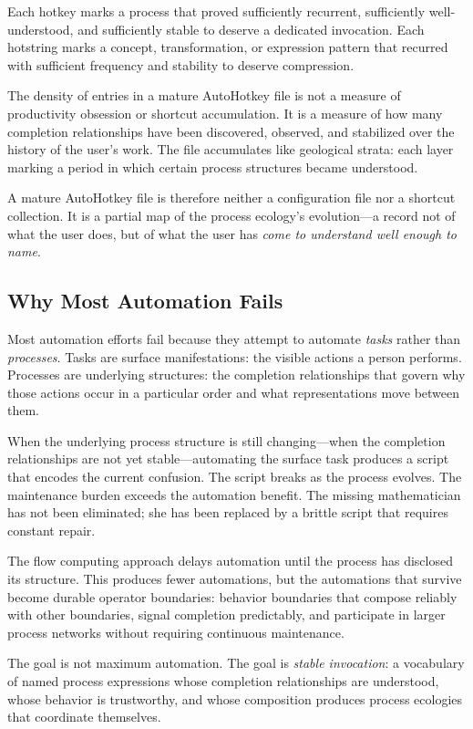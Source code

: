 \documentclass[12pt, a4paper]{article}
\begin{document}
Each hotkey marks a process that proved sufficiently recurrent,
sufficiently well-understood, and sufficiently stable to deserve a
dedicated invocation. Each hotstring marks a concept, transformation,
or expression pattern that recurred with sufficient frequency and
stability to deserve compression.

The density of entries in a mature AutoHotkey file is not a measure
of productivity obsession or shortcut accumulation. It is a measure
of how many completion relationships have been discovered, observed,
and stabilized over the history of the user's work. The file
accumulates like geological strata: each layer marking a period in
which certain process structures became understood.

A mature AutoHotkey file is therefore neither a configuration file
nor a shortcut collection. It is a partial map of the process
ecology's evolution---a record not of what the user does, but of
what the user has \emph{come to understand well enough to name}.

\subsection{Why Most Automation Fails}

Most automation efforts fail because they attempt to automate
\emph{tasks} rather than \emph{processes}. Tasks are surface
manifestations: the visible actions a person performs. Processes
are underlying structures: the completion relationships that
govern why those actions occur in a particular order and what
representations move between them.

When the underlying process structure is still changing---when
the completion relationships are not yet stable---automating the
surface task produces a script that encodes the current confusion.
The script breaks as the process evolves. The maintenance burden
exceeds the automation benefit. The missing mathematician has not
been eliminated; she has been replaced by a brittle script that
requires constant repair.

The flow computing approach delays automation until the process
has disclosed its structure. This produces fewer automations, but
the automations that survive become durable operator boundaries:
behavior boundaries that compose reliably with other boundaries,
signal completion predictably, and participate in larger
process networks without requiring continuous maintenance.

The goal is not maximum automation. The goal is \emph{stable
invocation}: a vocabulary of named process expressions whose
completion relationships are understood, whose behavior is
trustworthy, and whose composition produces process ecologies
that coordinate themselves.
\end{document}

